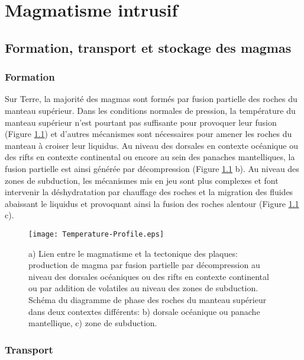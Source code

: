 \chapter{Magmatisme intrusif}
\label{chap1}
\minitoc

\section{Formation, transport et stockage des magmas}
\label{C1-sec:magm-intr-un}

\subsection{Formation}
\label{C1-sec:formation-1}

Sur Terre, la majorité des magmas sont formés par fusion partielle des
roches  du  manteau  supérieur.    Dans  les  conditions  normales  de
pression,  la  température du  manteau  supérieur  n'est pourtant  pas
suffisante pour  provoquer leur  fusion (Figure  \ref{C1-Geoterme}) et
d'autres mécanismes sont nécessaires pour amener les roches du manteau
à  croiser  leur  liquidus.   Au   niveau  des  dorsales  en  contexte
océanique ou des rifts en contexte  continental ou encore au sein des
panaches  mantelliques,  la fusion  partielle  est  ainsi générée  par
décompression (Figure  \ref{C1-Geoterme} b).   Au niveau des  zones de
subduction,  les mécanismes  mis en  jeu sont  plus complexes  et font
intervenir la déshydratation par chauffage  des roches et la migration
des fluides  abaissant le liquidus  et provoquant ainsi la  fusion des
roches alentour (Figure \ref{C1-Geoterme} c).
\begin{figure}[h!]
  \begin{center}
    \graphicspath{ {/Users/thorey/Documents/These/Manuscript/Figure/Chapter1/} }
    \texttt{[image: Temperature-Profile.eps]}
    \caption{a) Lien entre le magmatisme et la tectonique des plaques:
      production de  magma par  fusion partielle par  décompression au
      niveau  des  dorsales  océaniques   ou  des  rifts  en  contexte
      continental ou par addition de  volatiles au niveau des zones de
      subduction. Schéma du  diagramme de phase des  roches du manteau
      supérieur dans  deux contextes différents: b)  dorsale océanique
      ou panache mantellique, c) zone de subduction.}
    \label{C1-Geoterme}
  \end{center}
\end{figure}

\subsection{Transport}
\label{C1-sec:transport}

